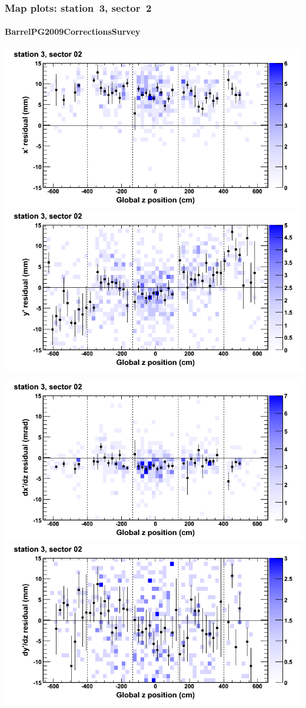 \documentclass[compress]{beamer}
\begin{document}
\begin{frame}
\frametitle{Map plots: station~3, sector~2}
\framesubtitle{BarrelPG2009CorrectionsSurvey}
\includegraphics[width=0.5\linewidth]{mapplots_01/DTvsz_st3sec02_x.png}
\includegraphics[width=0.5\linewidth]{mapplots_01/DTvsz_st3sec02_y.png}

\includegraphics[width=0.5\linewidth]{mapplots_01/DTvsz_st3sec02_dxdz.png}
\includegraphics[width=0.5\linewidth]{mapplots_01/DTvsz_st3sec02_dydz.png}
\end{frame}
\end{document}
